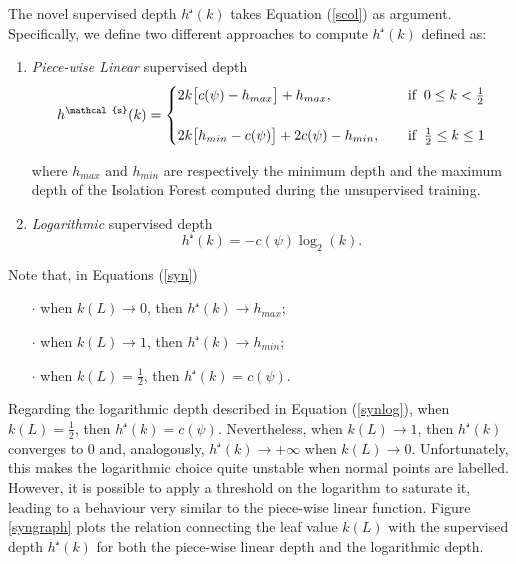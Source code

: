 The novel supervised depth $h^\mathcal{s}(k)$ takes Equation (\ref{scol}) as argument. Specifically, we define two different approaches to compute $h^\mathcal{s}(k)$ defined as:
\begin{enumerate}
    \item \textit{Piece-wise Linear} supervised depth
    \begin{equation}
    \begin{split}
    h^\mathcal{s}(k)=\begin{cases}
     2k\big[c(\psi)-h_{max}\big]+h_{max},  \hspace{0.4cm} & \text{if} \;\; 0 \leq k < \frac{1}{2} \\
     & \\
     2k\big[h_{min}-c(\psi)\big]+2c(\psi)-h_{min}, \hspace{0.4cm} &\text{if} \;\; \frac{1}{2} \leq k \leq 1\\
    \end{cases} \label{syn}
    \end{split}
    \end{equation}

where $h_{max}$ and $h_{min}$ are respectively the minimum depth and the maximum depth of the Isolation Forest computed during the unsupervised training. 
    \item \textit{Logarithmic} supervised depth
    \begin{equation}
        h^\mathcal{s}(k)= - c(\psi) \log_2(k).
        \label{synlog}
    \end{equation}
\end{enumerate}
Note that, in Equations (\ref{syn})
\begin{enumerate}
    \item[$\cdot$] when $k(L) \rightarrow 0$, then $h^\mathcal{s}(k) \rightarrow h_{max}$;
    \item[$\cdot$] when $k(L) \rightarrow 1$, then $h^\mathcal{s}(k) \rightarrow h_{min}$;
     \item[$\cdot$] when $k(L) = \frac{1}{2}$, then $h^\mathcal{s}(k) = c(\psi)$.
\end{enumerate}
Regarding the logarithmic depth described in Equation (\ref{synlog}), when $k(L) = \frac{1}{2}$, then $h^\mathcal{s}(k) = c(\psi)$. Nevertheless, when $k(L) \rightarrow 1$, then $h^\mathcal{s}(k)$ converges to $0$ and, analogously, $h^\mathcal{s}(k) \rightarrow +\infty$ when $k(L) \rightarrow 0$. Unfortunately, this makes the logarithmic choice quite unstable when normal points are labelled. However, it is possible to apply a threshold on the logarithm to saturate it, leading to a behaviour very similar to the piece-wise linear function.
Figure \ref{syngraph} plots the relation connecting the leaf value $k(L)$ with the supervised depth $h^\mathcal{s}(k)$ for both the piece-wise linear depth and the logarithmic depth. 

